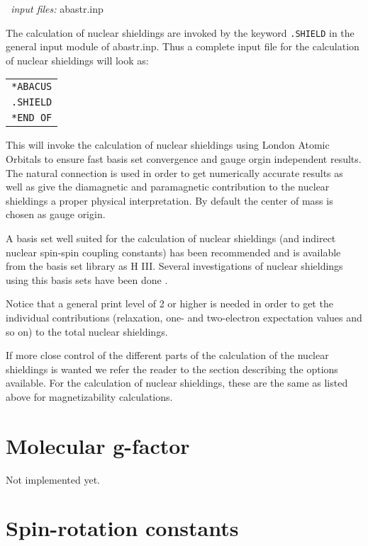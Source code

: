 {\it \aba\ input files:} abastr.inp

\bigskip

The calculation of nuclear shieldings are invoked by the
keyword \verb|.SHIELD| in the general input module of abastr.inp. Thus
a complete input file for the calculation of nuclear shieldings will
look as: 

\smallskip

\begin{tabular}{l}
\verb|*ABACUS|\\
\verb|.SHIELD|\\
\verb|*END OF|
\end{tabular}

\smallskip

This will invoke the calculation of nuclear shieldings using
London Atomic Orbitals to ensure fast basis set convergence and gauge
orgin independent results. The natural connection \cite{joklbkrthpj}
is used in order to get 
numerically accurate results as well as give the diamagnetic and
paramagnetic contribution to the nuclear shieldings a proper physical
interpretation. By default the center of mass is chosen as gauge
origin.

A basis set well suited for the calculation of nuclear shieldings (and
indirect nuclear spin-spin coupling constants) has been recommended
\cite{pdkrthklbpj} and is available from the basis set library as H
III. Several investigations of nuclear shieldings using this basis
sets have been done
\cite{mjthkrklbpjcpl220,krthrkpjklbhjajjcp100,krthklbpjcpl226}.

Notice that a general print level of 2 or higher is needed in order to
get the individual contributions (relaxation, one- and
two-electron expectation values and so on) to the total nuclear shieldings.
 
If more close control of the different parts of the calculation of the
nuclear shieldings is wanted we refer the reader to the section
describing the options available. For the calculation of nuclear
shieldings, these are the same as listed above for magnetizability
calculations.

\section{Molecular g-factor}\label{sec:gfac}

Not implemented yet.

\section{Spin-rotation constants}\label{sec:spinrotasjon}

